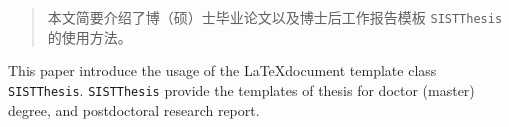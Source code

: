 \begin{abstract}
本文简要介绍了博（硕）士毕业论文以及博士后工作报告模板 \verb|SISTThesis|的使用方法。

\end{abstract}

\begin{englishabstract}
This paper introduce the usage of the \LaTeX document template class \verb|SISTThesis|.  \verb|SISTThesis| provide the templates of thesis for doctor (master) degree, and postdoctoral research report.


\end{englishabstract}
